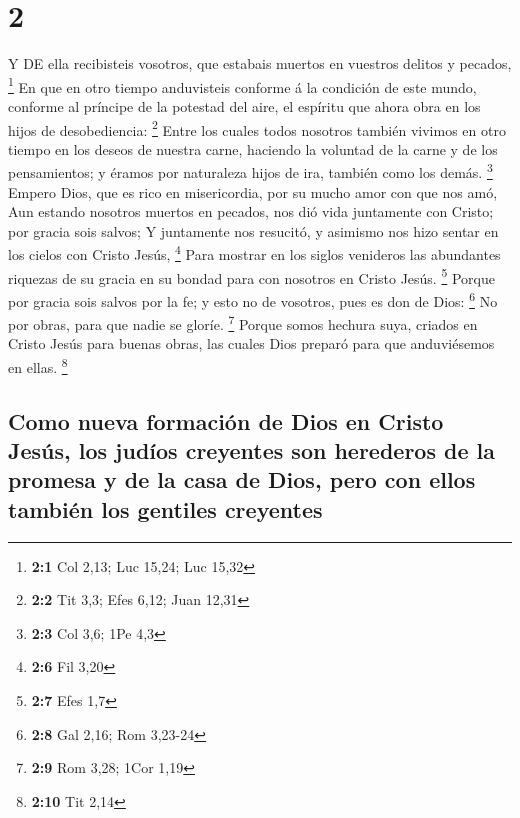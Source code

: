 \hypertarget{section-1}{%
\section{2}\label{section-1}}

 Y DE ella recibisteis vosotros, que estabais muertos en
vuestros delitos y pecados, \footnote{\textbf{2:1} Col 2,13; Luc 15,24;
  Luc 15,32}  En que en otro tiempo anduvisteis conforme á
la condición de este mundo, conforme al príncipe de la potestad del
aire, el espíritu que ahora obra en los hijos de desobediencia:
\footnote{\textbf{2:2} Tit 3,3; Efes 6,12; Juan 12,31} 
Entre los cuales todos nosotros también vivimos en otro tiempo en los
deseos de nuestra carne, haciendo la voluntad de la carne y de los
pensamientos; y éramos por naturaleza hijos de ira, también como los
demás. \footnote{\textbf{2:3} Col 3,6; 1Pe 4,3}  Empero
Dios, que es rico en misericordia, por su mucho amor con que nos amó,
 Aun estando nosotros muertos en pecados, nos dió vida
juntamente con Cristo; por gracia sois salvos;  Y juntamente
nos resucitó, y asimismo nos hizo sentar en los cielos con Cristo Jesús,
\footnote{\textbf{2:6} Fil 3,20}  Para mostrar en los siglos
venideros las abundantes riquezas de su gracia en su bondad para con
nosotros en Cristo Jesús. \footnote{\textbf{2:7} Efes 1,7} 
Porque por gracia sois salvos por la fe; y esto no de vosotros, pues es
don de Dios: \footnote{\textbf{2:8} Gal 2,16; Rom 3,23-24} 
No por obras, para que nadie se gloríe. \footnote{\textbf{2:9} Rom 3,28;
  1Cor 1,19}  Porque somos hechura suya, criados en Cristo
Jesús para buenas obras, las cuales Dios preparó para que anduviésemos
en ellas. \footnote{\textbf{2:10} Tit 2,14}

\hypertarget{como-nueva-formaciuxf3n-de-dios-en-cristo-jesuxfas-los-juduxedos-creyentes-son-herederos-de-la-promesa-y-de-la-casa-de-dios-pero-con-ellos-tambiuxe9n-los-gentiles-creyentes}{%
\subsection{Como nueva formación de Dios en Cristo Jesús, los judíos
creyentes son herederos de la promesa y de la casa de Dios, pero con
ellos también los gentiles
creyentes}\label{como-nueva-formaciuxf3n-de-dios-en-cristo-jesuxfas-los-juduxedos-creyentes-son-herederos-de-la-promesa-y-de-la-casa-de-dios-pero-con-ellos-tambiuxe9n-los-gentiles-creyentes}}

